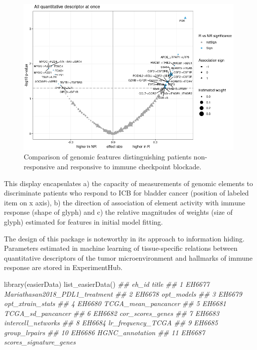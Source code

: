 \documentclass[]{article}
\newcommand{\hlcom}[1]{\textcolor[rgb]{0.502,0.502,0.502}{\textit{#1}}}%
\newcommand{\hlstd}[1]{\textcolor[rgb]{0.251,0.251,0.251}{#1}}%
\newcommand{\hlkwd}[1]{\textcolor[rgb]{0.878,0.439,0.125}{#1}}%
\newenvironment{Shaded}{\begin{myshaded}}{\end{myshaded}}
\newcommand{\KeywordTok}[1]{\hlkwd{#1}}
\newcommand{\CommentTok}[1]{\hlcom{#1}}
\newcommand{\NormalTok}[1]{\hlstd{#1}}
\begin{document}
\begin{figure}
\includegraphics[width=0.95\linewidth,]{easierFinal} \caption{Comparison of genomic features distinguishing patients non-responsive and responsive to immune checkpoint blockade.}\label{fig:easfin}
\end{figure}

This display encapsulates a) the capacity of measurements of
genomic elements to discriminate patients who respond
to ICB for bladder cancer (position of labeled
item on x axis), b) the direction of association of
element activity with immune response (shape of glyph) and c) the
relative magnitudes of weights (size of glyph) estimated for features in
initial model fitting.

The design of this package is noteworthy in its approach
to information hiding. Parameters estimated in machine
learning of tissue-specific relations between quantitative
descriptors of the tumor microenvironment and hallmarks
of immune response are stored in ExperimentHub.

\begin{Shaded}
\begin{Highlighting}[]
\KeywordTok{library}\NormalTok{(easierData)}
\KeywordTok{list\_easierData}\NormalTok{()}
\CommentTok{\#\#     eh\_id                          title}
\CommentTok{\#\# 1  EH6677 Mariathasan2018\_PDL1\_treatment}
\CommentTok{\#\# 2  EH6678                     opt\_models}
\CommentTok{\#\# 3  EH6679               opt\_xtrain\_stats}
\CommentTok{\#\# 4  EH6680            TCGA\_mean\_pancancer}
\CommentTok{\#\# 5  EH6681              TCGA\_sd\_pancancer}
\CommentTok{\#\# 6  EH6682               cor\_scores\_genes}
\CommentTok{\#\# 7  EH6683             intercell\_networks}
\CommentTok{\#\# 8  EH6684              lr\_frequency\_TCGA}
\CommentTok{\#\# 9  EH6685                  group\_lrpairs}
\CommentTok{\#\# 10 EH6686                HGNC\_annotation}
\CommentTok{\#\# 11 EH6687         scores\_signature\_genes}
\end{Highlighting}
\end{Shaded}
\end{document}
